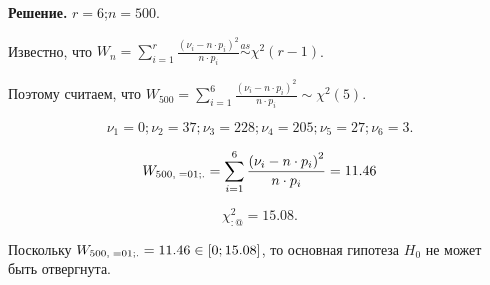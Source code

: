 \textbf{Решение. }$r=6$;$n=500$. 

Известно, что $W_{n} =\sum _{i=1}^{r}\frac{\left(\nu _{i} -n\cdot p_{i} \right)^{2} }{n\cdot p_{i} }  \mathop{\sim }\limits^{as} \chi ^{2} \left(r-1\right)$.

Поэтому считаем, что $W_{500} =\sum _{i=1}^{6}\frac{\left(\nu _{i} -n\cdot p_{i} \right)^{2} }{n\cdot p_{i} }  \sim \chi ^{2} \left(5\right)$.

\[\nu _{1} =0; \nu _{2} =37; \nu _{3} =228; \nu _{4} =205; \nu _{5} =27; \nu _{6} =3.\] 



\[W_{500,\; =01;.} =\sum _{i=1}^{6}\frac{\left(\nu _{i} -n\cdot p_{i} \right)^{2} }{n\cdot p_{i} }  ={\rm 11.46}\] 

\[\chi _{:@}^{2} =15.08.\] 

Поскольку $W_{500,\; =01;.} ={\rm 11.46}\in \left[0;15.08\right]$, то основная гипотеза $H_{0} $ не может быть отвергнута.





